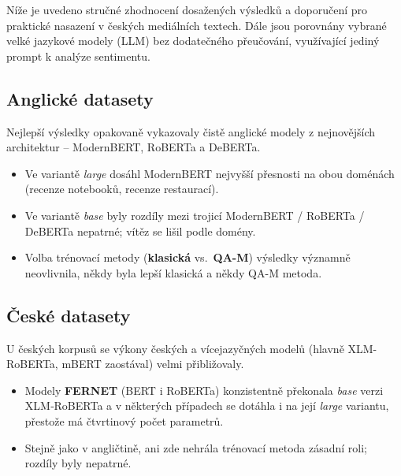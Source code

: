 Níže je uvedeno stručné zhodnocení dosažených výsledků a doporučení pro praktické nasazení v českých mediálních textech. Dále jsou porovnány vybrané velké jazykové modely (LLM) bez dodatečného přeučování, využívající jediný prompt k analýze sentimentu.

\subsection{Anglické datasety}
Nejlepší výsledky opakovaně vykazovaly čistě anglické modely
z nejnovějších architektur -- ModernBERT, RoBERTa a DeBERTa.
\begin{itemize}
  \item Ve variantě \emph{large} dosáhl ModernBERT nejvyšší přesnosti na obou doménách (recenze notebooků, recenze restaurací).
  \item Ve variantě \emph{base} byly rozdíly mezi trojicí ModernBERT / RoBERTa / DeBERTa nepatrné; vítěz se lišil podle domény.
  \item Volba trénovací metody (\textbf{klasická} vs.~\textbf{QA-M}) výsledky významně neovlivnila, někdy byla lepší klasická a někdy QA-M metoda.
\end{itemize}

\subsection{České datasety}
U českých korpusů se výkony českých a vícejazyčných modelů (hlavně XLM-RoBERTa, mBERT zaostával) velmi přibližovaly.
\begin{itemize}
  \item Modely \textbf{FERNET} (BERT i RoBERTa) konzistentně překonala \emph{base} verzi XLM‑RoBERTa a v některých případech se dotáhla i na její \emph{large} variantu, přestože má čtvrtinový počet parametrů.
  \item Stejně jako v angličtině, ani zde nehrála trénovací metoda zásadní roli; rozdíly byly nepatrné.
\end{itemize}

